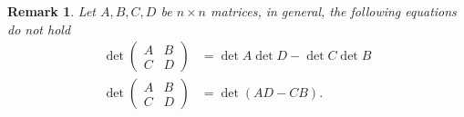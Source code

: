 \documentclass[11pt]{book}
\newtheorem{remark}{Remark}[section]
\theoremstyle{definition}
\numberwithin{equation}{chapter}
\begin{document}
\begin{remark}
Let $A,B,C,D$ be $n\times n$ matrices, in general, the following equations do not hold
\begin{align*}
    \det \left(
    \begin{matrix}
        A & B\\
        C & D
    \end{matrix}
    \right) & = \det A \det D - \det C \det B \\
    \det \left(
    \begin{matrix}
        A & B\\
        C & D
    \end{matrix}
    \right)& = \det(AD - CB).
\end{align*}
\end{remark}

\medskip
\end{document}
